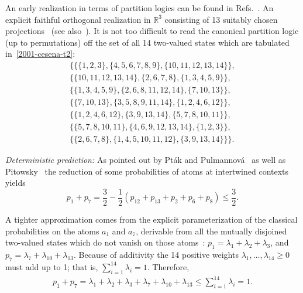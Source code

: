 An early realization in terms of partition logics
can be found in Refs.~\cite{svozil-tkadlec,svozil-2008-ql}.
An explicit faithful orthogonal realization  in $\mathbb{R}^3$
consisting of  13 suitably chosen projections~\cite[p.~206, Figure~1]{tkadlec-96}
(see also~\cite[Figure~4, p.~5387]{svozil-tkadlec}).
It is not too difficult to read the canonical partition logic (up to permutations) off
the set of all 14 two-valued states which are tabulated in~\ref{2001-cesena-t2}:
\begin{equation}
\begin{split}
\{
\{
\{1,2,3\},\{4,5,6,7,8,9\},\{10,11,12,13,14\}
\}
,\\
\{
\{10,11,12,13,14\},\{2,6,7,8\},\{1,3,4,5,9\}
\}
,\\
\{
\{1,3,4,5,9\},\{2,6,8,11,12,14\},\{7,10,13\}
\}
,\\
\{
\{7,10,13\},\{3,5,8,9,11,14\},\{1,2,4,6,12\}
\}
,\\
\{
\{1,2,4,6,12\},\{3,9,13,14\},\{5,7,8,10,11\}
\}
,\\
\{
\{5,7,8,10,11\},\{4,6,9,12,13,14\},\{1,2,3\}
\}
,\\
\{
\{2,6,7,8\},\{1,4,5,10,11,12\},\{3,9,13,14\}
\}
\}.
\end{split}
\end{equation}


{\em Deterministic prediction:}
As  pointed out by Pt{\'{a}}k and Pulmannov{\'{a}}~\cite[p.~39, Figure~2.4.6]{pulmannova-91}
as well as
Pitowsky~\cite{Pitowsky2003395,pitowsky-06}
the reduction of some probabilities of atoms at intertwined contexts yields~\cite[p.~285, Eq.~(11.2)]{svozil-2016-s}
\begin{equation}
p_1+p_7=\frac{3}{2}- \frac{1}{2}\left(p_{12}+p_{13}+p_2+p_6+p_8\right)\le \frac{3}{2}
.
\label{2015-s-e2}
\end{equation}

A tighter approximation comes from the explicit parameterization of the classical probabilities on the atoms $a_1$ and $a_7$,
derivable from all the mutually disjoined two-valued states which do not vanish on those atoms~\cite[Figure~12.9]{svozil-2016-pu-book}:
$p_1= \lambda_1 + \lambda_2 + \lambda_3$, and
$p_7= \lambda_7 + \lambda_{10} + \lambda_{13}$.
Because of additivity the 14 positive weights $\lambda_{1},\ldots ,\lambda_{14} \ge 0$
must add up to 1; that is, $\sum_{i=1}^{14} \lambda_{i}=1$.
Therefore,
\begin{equation}
\begin{split}
p_{1} + p_{7}
= \lambda_1 + \lambda_2 + \lambda_3 + \lambda_7 + \lambda_{10} + \lambda_{13}
\le \sum_{i=1}^{14} \lambda_{i}=1
.
\end{split}
\label{2017-b-spbp17}
\end{equation}



